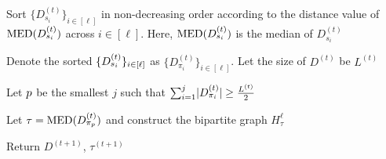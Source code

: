\begin{algorithm}[h]
\SetAlgoNoEnd
    \caption{The Median of Medians $\mom(D^{(t)})$}
    \label{alg:median-median}
    \SetAlgoLined

    Sort $\{D_{s_i}^{(t)}\}_{i \in [\ell]}$ in non-decreasing order according to the distance value of $\operatorname{MED}(D_{s_i}^{(t)})$ across $i \in [\ell]$. Here, $\operatorname{MED}(D_{s_i}^{(t)})$ is the median of $D_{s_i}^{(t)}$

    Denote the sorted $\{D_{s_i}^{(t)}\}_{i \in [\ell]}$ as $\{D_{\pi_i}^{(t)}\}_{i \in [\ell]}$.
    Let the size of $D^{(t)}$ be $L^{(t)}$



    Let $p$ be the smallest $j$ such that $\sum_{i=1}^{j} \lvert D_{\pi_{i}}^{(t)} \rvert  \geq \frac{L^{(t)}}{2}$ 



    Let $\tau = \operatorname{MED}(D_{\pi_{p}}^{(t)})$ and construct the bipartite graph $H^{\ell}_{\tau}$ \label{algo:find-pivot}

    Return $D^{(t+1)}$, $\tau^{(t+1)}$
\end{algorithm}

